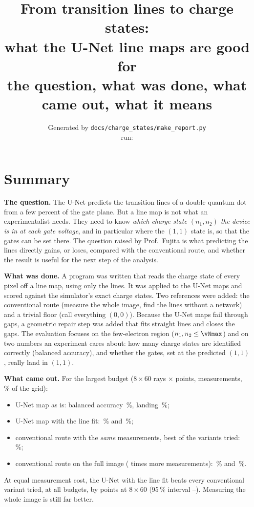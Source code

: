 \documentclass[10pt,a4paper]{article}
\title{From transition lines to charge states:\\
what the U-Net line maps are good for\\[4pt]
\large the question, what was done, what came out, what it means}
\author{\small Generated by \texttt{docs/charge\_states/make\_report.py}\\
\small run: \texttt{\vRun}}
\date{}
\begin{document}
\maketitle

\section*{Summary}

\textbf{The question.}  The U-Net predicts the transition lines of a double
quantum dot from a few percent of the gate plane.  But a line map is not
what an experimentalist needs.  They need to know \emph{which charge state
$(n_1,n_2)$ the device is in at each gate voltage}, and in particular where
the $(1,1)$ state is, so that the gates can be set there.  The question
raised by Prof.\ Fujita is what predicting the lines directly gains, or
loses, compared with the conventional route, and whether the result is
useful for the next step of the analysis.

\textbf{What was done.}  A program was written that reads the charge state of
every pixel off a line map, using only the lines.  It was applied to the
U-Net maps and scored against the simulator's exact charge states.  Two
references were added: the conventional route (measure the whole image, find
the lines without a network) and a trivial floor (call everything $(0,0)$).
Because the U-Net maps fail through gaps, a geometric repair step was added
that fits straight lines and closes the gaps.  The evaluation focuses on
the few-electron region ($n_1,n_2\le\vNmax$) and on two numbers an
experiment cares about: how many charge states are identified correctly
(balanced accuracy), and whether the gates, set at the predicted $(1,1)$,
really land in $(1,1)$.

\textbf{What came out.}  For the largest budget ($8\times60$ rays $\times$
points, \vEqNPts{} measurements, \vUCov\,\% of the grid):
\begin{itemize}
\item U-Net map as is: balanced accuracy \vUBal\,\%, landing \vULand\,\%;
\item U-Net map with the line fit: \vFBal\,\% and \vFLand\,\%;
\item conventional route with the \emph{same} \vEqNPts{} measurements, best
  of the variants tried: \vEqCompBal\,\%;
\item conventional route on the full image (\vFold{} times more
  measurements): \vDBal\,\% and \vDLand\,\%.
\end{itemize}
At equal measurement cost, the U-Net with the line fit beats every
conventional variant tried, at all \vEqNBud{} budgets, by \vEqDiff{} points
at $8\times60$ (95\,\% interval \vEqDiffLo--\vEqDiffHi).  Measuring the whole
image is still far better.
\end{document}

